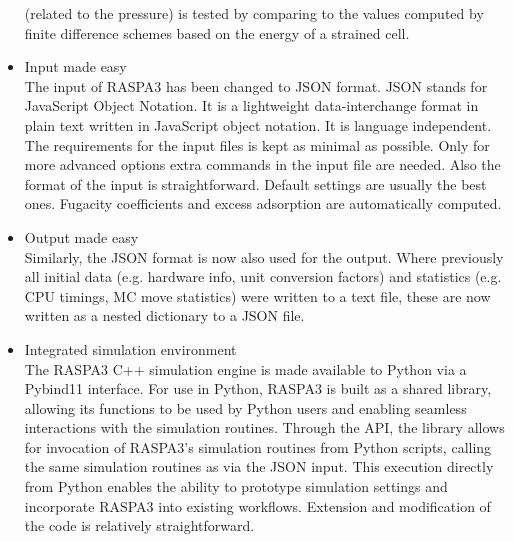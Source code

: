 \begin{itemize}
  (related to the pressure) is tested by comparing to the values computed by finite difference schemes 
  based on the energy of a strained cell.
  \item{Input made easy}\\
  The input of RASPA3 has been changed to JSON format. 
  JSON stands for JavaScript Object Notation. It is a lightweight data-interchange format in plain text 
  written in JavaScript object notation. It is language independent.
  The requirements for the input files is kept as minimal as possible. 
  Only for more advanced options extra commands in the input file are
  needed. Also the format of the input is straightforward. Default settings are usually the best ones. 
  Fugacity coefficients and excess adsorption are automatically computed.
  \item{Output made easy}\\
  Similarly, the JSON format is now also used for the output. Where previously all initial data 
  (e.g. hardware info, unit conversion factors) and statistics (e.g. CPU timings, MC move statistics) 
  were written to a text file, these are now written as a nested dictionary to a JSON file.
  \item{Integrated simulation environment}\\
  The RASPA3 C++ simulation engine is made available to Python via a Pybind11 interface. 
  For use in Python, RASPA3 is built as a shared library, allowing its functions to be used by Python 
  users and enabling seamless interactions with the simulation routines.
  Through the API, the library allows for invocation of RASPA3's simulation routines from Python scripts, 
  calling the same simulation routines as via the JSON input. This execution directly from Python enables 
  the ability to prototype simulation settings and incorporate RASPA3 into existing workflows.
  Extension and modification of the code is relatively straightforward.
\end{itemize}

